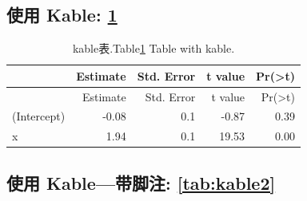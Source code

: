 \documentclass[12pt,a4paper,zihao=-4,UTF8]{book}
\newenvironment{Shaded}{\begin{snugshade}}{\end{snugshade}}
\newcommand{\KeywordTok}[1]{\textcolor[rgb]{0.13,0.29,0.53}{\textbf{#1}}}
\newcommand{\DataTypeTok}[1]{\textcolor[rgb]{0.13,0.29,0.53}{#1}}
\newcommand{\DecValTok}[1]{\textcolor[rgb]{0.00,0.00,0.81}{#1}}
\newcommand{\CharTok}[1]{\textcolor[rgb]{0.31,0.60,0.02}{#1}}
\newcommand{\StringTok}[1]{\textcolor[rgb]{0.31,0.60,0.02}{#1}}
\newcommand{\OtherTok}[1]{\textcolor[rgb]{0.56,0.35,0.01}{#1}}
\newcommand{\OperatorTok}[1]{\textcolor[rgb]{0.81,0.36,0.00}{\textbf{#1}}}
\newcommand{\NormalTok}[1]{#1}
\begin{document}
\subsection{\texorpdfstring{使用 Kable:
\cref{tab:kable1}}{使用 Kable: }}\label{-kable}

\begin{Shaded}
\end{Shaded}

\begin{longtable}[]{@{}lrrrr@{}}
\caption{\label{tab:kable1}kable表.\protect\linebreak  Table\ref{tab:kable1}
Table with kable.}\tabularnewline
\toprule
& Estimate & Std. Error & t value &
Pr(\textgreater{}\textbar{}t\textbar{})\tabularnewline
\midrule
\endfirsthead
\toprule
& Estimate & Std. Error & t value &
Pr(\textgreater{}\textbar{}t\textbar{})\tabularnewline
\midrule
\endhead
(Intercept) & -0.08 & 0.1 & -0.87 & 0.39\tabularnewline
x & 1.94 & 0.1 & 19.53 & 0.00\tabularnewline
\bottomrule
\end{longtable}

\subsection{\texorpdfstring{使用 Kable---带脚注:
\cref{tab:kable2}}{使用 Kable---带脚注: }}\label{-kable}
\end{document}
